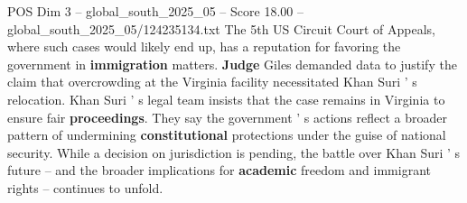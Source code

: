 \begin{textsample}{POS Dim 3 – global\_south\_2025\_05 – Score 18.00 – global\_south\_2025\_05/124235134.txt}
The 5th US Circuit Court of Appeals, where such cases would likely end up, has a reputation for favoring the government in \textbf{immigration} matters. \textbf{Judge} Giles demanded data to justify the claim that overcrowding at the Virginia facility necessitated Khan Suri ' s relocation.
Khan Suri ' s legal team insists that the case remains in Virginia to ensure fair \textbf{proceedings}.
They say the government ' s actions reflect a broader pattern of undermining \textbf{constitutional} protections under the guise of national security.
While a decision on jurisdiction is pending, the battle over Khan Suri ' s future -- and the broader implications for \textbf{academic} freedom and immigrant rights -- continues to unfold.

\end{textsample}
